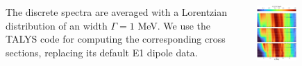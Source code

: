 \documentclass[25pt, a0paper, portrait]{tikzposter}
\begin{document}
\begin{columns}
{	The discrete spectra are averaged with a Lorentzian distribution of an width $\Gamma = 1 $ MeV.
	We use the
    TALYS code for computing the corresponding cross sections, replacing its default
    E1 dipole data.
}

    {
        \begin{tikzfigure}
            \includegraphics[width=0.4\textwidth]{images/colormesh.pdf}
        \end{tikzfigure}
    }






\end{columns}
\end{document}
